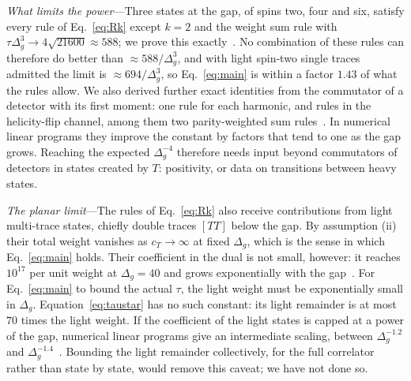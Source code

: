 \documentclass[aps,prl,twocolumn,superscriptaddress,nofootinbib,floatfix]{revtex4-2}
\begin{document}
\textit{What limits the power}---Three states at the gap, of spins two, four and six, satisfy every rule of Eq.~\eqref{eq:Rk} except
$k=2$ and the weight sum rule with $\tau\Delta_g^3\to4\sqrt{21600}\approx588$; we prove this exactly~\cite{SM}. No combination of these
rules can therefore do better than $\approx588/\Delta_g^3$, and with light spin-two single traces admitted the limit is $\approx694/\Delta_g^3$,
so Eq.~\eqref{eq:main} is within a factor $1.43$ of what the rules allow. We also derived further exact identities from the commutator of a
detector with its first moment: one rule for each harmonic, and rules in the helicity-flip channel, among them two parity-weighted sum
rules~\cite{SM}. In numerical linear programs they improve the constant by factors that tend to one as the gap grows. Reaching the
expected $\Delta_g^{-4}$ therefore needs input beyond commutators of detectors in states created by $T$: positivity, or data on
transitions between heavy states.

\textit{The planar limit}---The rules of Eq.~\eqref{eq:Rk} also receive contributions from light multi-trace states, chiefly double traces
$[TT]$ below the gap. By assumption (ii) their total weight vanishes as $c_T\to\infty$ at fixed $\Delta_g$, which is the sense in which
Eq.~\eqref{eq:main} holds. Their coefficient in the dual is not small, however: it reaches $10^{17}$ per unit weight at $\Delta_g=40$ and
grows exponentially with the gap~\cite{SM}. For Eq.~\eqref{eq:main} to bound the actual $\tau$, the light weight must be exponentially small
in $\Delta_g$. Equation~\eqref{eq:taustar} has no such constant: its light remainder is at most $70$ times the light weight. If the
coefficient of the light states is capped at a power of the gap, numerical linear programs give an intermediate scaling, between
$\Delta_g^{-1.2}$ and $\Delta_g^{-1.4}$~\cite{SM}. Bounding the light remainder collectively, for the full correlator rather than state by
state, would remove this caveat; we have not done so.
\end{document}
